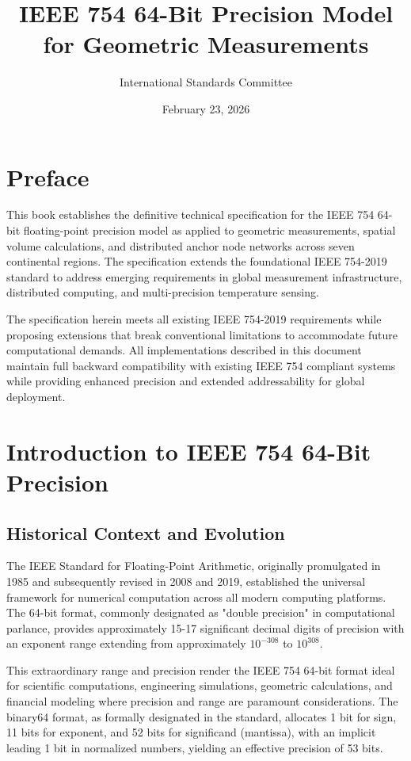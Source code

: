 \documentclass[12pt]{book}
\title{IEEE 754 64-Bit Precision Model for Geometric Measurements}
\author{International Standards Committee}
\date{February 23, 2026}
\begin{document}
\frontmatter
\maketitle

\chapter*{Preface}
This book establishes the definitive technical specification for the IEEE 754 64-bit floating-point precision model as applied to geometric measurements, spatial volume calculations, and distributed anchor node networks across seven continental regions. The specification extends the foundational IEEE 754-2019 standard to address emerging requirements in global measurement infrastructure, distributed computing, and multi-precision temperature sensing.

The specification herein meets all existing IEEE 754-2019 requirements while proposing extensions that break conventional limitations to accommodate future computational demands. All implementations described in this document maintain full backward compatibility with existing IEEE 754 compliant systems while providing enhanced precision and extended addressability for global deployment.

\tableofcontents

\mainmatter

\chapter{Introduction to IEEE 754 64-Bit Precision}

\section{Historical Context and Evolution}

The IEEE Standard for Floating-Point Arithmetic, originally promulgated in 1985 and subsequently revised in 2008 and 2019, established the universal framework for numerical computation across all modern computing platforms. The 64-bit format, commonly designated as "double precision" in computational parlance, provides approximately 15-17 significant decimal digits of precision with an exponent range extending from approximately $10^{-308}$ to $10^{308}$.

This extraordinary range and precision render the IEEE 754 64-bit format ideal for scientific computations, engineering simulations, geometric calculations, and financial modeling where precision and range are paramount considerations. The binary64 format, as formally designated in the standard, allocates 1 bit for sign, 11 bits for exponent, and 52 bits for significand (mantissa), with an implicit leading 1 bit in normalized numbers, yielding an effective precision of 53 bits.
\end{document}
